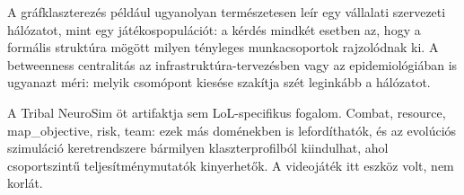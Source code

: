 A gráfklaszterezés például ugyanolyan természetesen leír egy vállalati szervezeti hálózatot, mint egy játékospopulációt: a kérdés mindkét esetben az, hogy a formális struktúra mögött milyen tényleges munkacsoportok rajzolódnak ki. A betweenness centralitás az infrastruktúra-tervezésben vagy az epidemiológiában is ugyanazt méri: melyik csomópont kiesése szakítja szét leginkább a hálózatot.

A Tribal NeuroSim öt artifaktja sem LoL-specifikus fogalom. Combat, resource, map\_objective, risk, team: ezek más doménekben is lefordíthatók, és az evolúciós szimuláció keretrendszere bármilyen klaszterprofilból kiindulhat, ahol csoportszintű teljesítménymutatók kinyerhetők. A videojáték itt eszköz volt, nem korlát.
